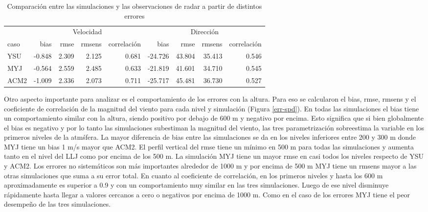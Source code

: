 \documentclass[12pt,spanish,oneside, a4paper]{book}
\begin{document}
\begin{table}[!h]

\caption{\label{tab:err-tabla}Comparación entre las simulaciones y las observaciones de radar a partir de distintos errores \label{err}}
\centering
\begin{tabular}[t]{lrrrrrrrr}
\toprule
\multicolumn{1}{c}{ } & \multicolumn{4}{c}{Velocidad} & \multicolumn{4}{c}{Dirección} \\
\cmidrule(l{2pt}r{2pt}){2-5} \cmidrule(l{2pt}r{2pt}){6-9}
caso & bias & rmse & rmsens & correlación & bias & rmse & rmsens & correlación\\
\midrule
YSU & -0.848 & 2.309 & 2.125 & 0.681 & -24.726 & 43.804 & 35.413 & 0.546\\
MYJ & -0.564 & 2.559 & 2.485 & 0.633 & -21.819 & 41.601 & 34.710 & 0.545\\
ACM2 & -1.009 & 2.336 & 2.073 & 0.711 & -25.717 & 45.481 & 36.730 & 0.527\\
\bottomrule
\end{tabular}
\end{table}

Otro aspecto importante para analizar es el comportamiento de los
errores con la altura. Para eso se calcularon el bias, rmse, rmsens y el
coeficiente de correlación de la magnitud del viento para cada nivel y
simulación (Figura \ref{err-spd}). En todas las simulaciones el bias
tiene un comportamiento similar con la altura, siendo positivo por
debajo de 600 m y negativo por encima. Esto significa que si bien
globalmente el bias es negativo y por lo tanto las simulaciones
subestiman la magnitud del viento, las tres parametrización sobreestima
la variable en los primeros niveles de la atmśfera. La mayor diferencia
de bias entre las simulaciones se da en los niveles inferiores entre 200
y 300 m donde MYJ tiene un bias 1 m/s mayor que ACM2. El perfil vertical
del rmse tiene un mínimo en 500 m para todas las simulaciones y aumenta
tanto en el nivel del LLJ como por encima de los 500 m. La simulación
MYJ tiene un mayor rmse en casi todos los niveles respecto de YSU y
ACM2. Los errores no sistemáticos son más importantes alrededor de 1000
m y por encima de 500 m MYJ tiene un rmsens mayor a las otras
simulaciones que suma a su error total. En cuanto al coeficiente de
correlación, en los primeros niveles y hasta los 600 m aproximadamente
es superior a 0.9 y con un comportamiento muy similar en las tres
simulaciones. Luego de ese nivel disminuye rápidamente hasta llegar a
valores cercanos a cero o negativos por encima de 1000 m. Como en el
caso de los errores MYJ tiene el peor desempeño de las tres
simulaciones.
\end{document}
